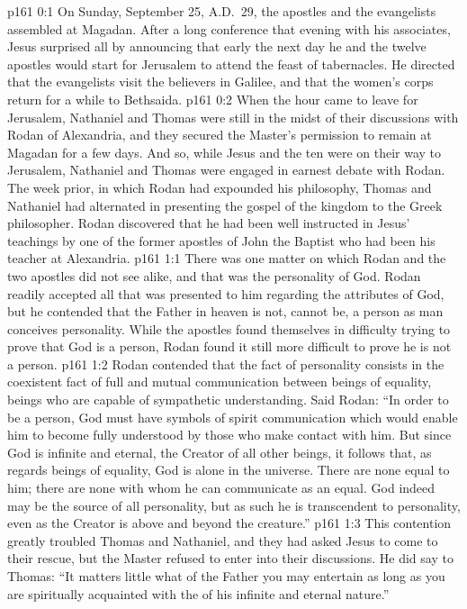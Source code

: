 \author{Midwayer Commission}
\vs p161 0:1 On Sunday, September 25, A.D.~29, the apostles and the evangelists assembled at Magadan. After a long conference that evening with his associates, Jesus surprised all by announcing that early the next day he and the twelve apostles would start for Jerusalem to attend the feast of tabernacles. He directed that the evangelists visit the believers in Galilee, and that the women’s corps return for a while to Bethsaida.
\vs p161 0:2 When the hour came to leave for Jerusalem, Nathaniel and Thomas were still in the midst of their discussions with Rodan of Alexandria, and they secured the Master’s permission to remain at Magadan for a few days. And so, while Jesus and the ten were on their way to Jerusalem, Nathaniel and Thomas were engaged in earnest debate with Rodan. The week prior, in which Rodan had expounded his philosophy, Thomas and Nathaniel had alternated in presenting the gospel of the kingdom to the Greek philosopher. Rodan discovered that he had been well instructed in Jesus’ teachings by one of the former apostles of John the Baptist who had been his teacher at Alexandria.
\vs p161 1:1 There was one matter on which Rodan and the two apostles did not see alike, and that was the personality of God. Rodan readily accepted all that was presented to him regarding the attributes of God, but he contended that the Father in heaven is not, cannot be, a person as man conceives personality. While the apostles found themselves in difficulty trying to prove that God is a person, Rodan found it still more difficult to prove he is not a person.
\vs p161 1:2 Rodan contended that the fact of personality consists in the coexistent fact of full and mutual communication between beings of equality, beings who are capable of sympathetic understanding. Said Rodan: “In order to be a person, God must have symbols of spirit communication which would enable him to become fully understood by those who make contact with him. But since God is infinite and eternal, the Creator of all other beings, it follows that, as regards beings of equality, God is alone in the universe. There are none equal to him; there are none with whom he can communicate as an equal. God indeed may be the source of all personality, but as such he is transcendent to personality, even as the Creator is above and beyond the creature.”
\vs p161 1:3 This contention greatly troubled Thomas and Nathaniel, and they had asked Jesus to come to their rescue, but the Master refused to enter into their discussions. He did say to Thomas: \textcolor{ubdarkred}{“It matters little what  of the Father you may entertain as long as you are spiritually acquainted with the  of his infinite and eternal nature.”}
